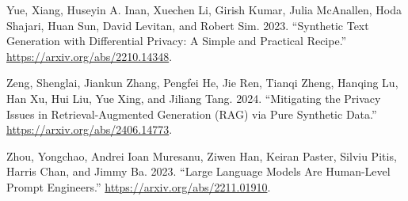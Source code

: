 \documentclass[
  12pt,
  a4paper,
]{article}
\newlength{\cslhangindent}
\newenvironment{CSLReferences}[2] %
 {\begin{list}{}{%
  \setlength{\itemindent}{0pt}
  \setlength{\leftmargin}{0pt}
  \setlength{\parsep}{0pt}
  \ifodd #1
   \setlength{\leftmargin}{\cslhangindent}
   \setlength{\itemindent}{-1\cslhangindent}
  \fi
  \setlength{\itemsep}{#2\baselineskip}}}
 {\end{list}}
\begin{document}
\begin{CSLReferences}{1}{0}
Yue, Xiang, Huseyin A. Inan, Xuechen Li, Girish Kumar, Julia McAnallen,
Hoda Shajari, Huan Sun, David Levitan, and Robert Sim. 2023.
{``Synthetic Text Generation with Differential Privacy: A Simple and
Practical Recipe.''} \url{https://arxiv.org/abs/2210.14348}.

Zeng, Shenglai, Jiankun Zhang, Pengfei He, Jie Ren, Tianqi Zheng,
Hanqing Lu, Han Xu, Hui Liu, Yue Xing, and Jiliang Tang. 2024.
{``Mitigating the Privacy Issues in Retrieval-Augmented Generation (RAG)
via Pure Synthetic Data.''} \url{https://arxiv.org/abs/2406.14773}.

Zhou, Yongchao, Andrei Ioan Muresanu, Ziwen Han, Keiran Paster, Silviu
Pitis, Harris Chan, and Jimmy Ba. 2023. {``Large Language Models Are
Human-Level Prompt Engineers.''} \url{https://arxiv.org/abs/2211.01910}.

\end{CSLReferences}
\end{document}
